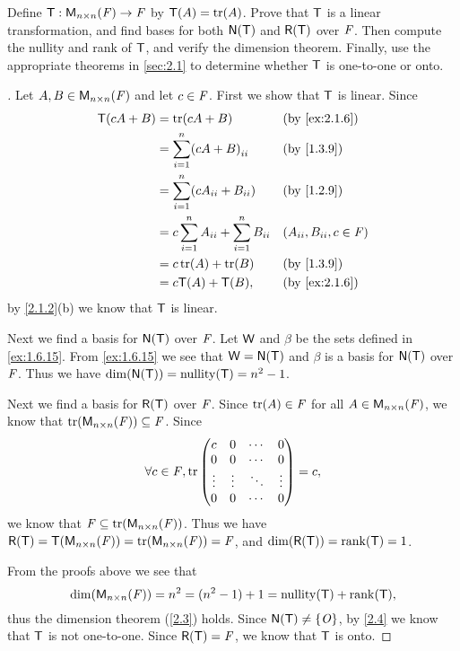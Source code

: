 \exercisesection

\setcounter{ex}{5}
\begin{ex}\label{ex:2.1.6}
  Define \(\mathsf{T} : \mathsf{M}_{{n} \times n}({\mathit{F}}) \to \mathit{F}\) by \(\T(A) = \tr[A]\).
  Prove that \(\mathsf{T}\) is a linear transformation, and find bases for both \(\ns{\T}\) and \(\rg{\T}\) over \(\mathit{F}\).
  Then compute the nullity and rank of \(\mathsf{T}\), and verify the dimension theorem.
  Finally, use the appropriate theorems in \cref{sec:2.1} to determine whether \(\mathsf{T}\) is one-to-one or onto.
\end{ex}

\begin{proof}[]
  Let \(A, B \in \mathsf{M}_{{n} \times n}({\mathit{F}})\) and let \(c \in \mathit{F}\).
  First we show that \(\mathsf{T}\) is linear.
  Since
  \begin{align*}
    \T(cA + B) & = \tr[cA + B]                                       &  & \text{(by \cref{ex:2.1.6})}  \\
               & = \sum_{i = 1}^n \pa{cA + B}_{i i}                  &  & \text{(by \cref{1.3.9})}     \\
               & = \sum_{i = 1}^n \pa{cA_{i i} + B_{i i}}            &  & \text{(by \cref{1.2.9})}     \\
               & = c \sum_{i = 1}^n A_{i i} + \sum_{i = 1}^n B_{i i} &  & (A_{i i}, B_{i i}, c \in \F) \\
               & = c \tr[A] + \tr[B]                                 &  & \text{(by \cref{1.3.9})}     \\
               & = c \T(A) + \T(B),                                  &  & \text{(by \cref{ex:2.1.6})}
  \end{align*}
  by \cref{2.1.2}(b) we know that \(\mathsf{T}\) is linear.

  Next we find a basis for \(\ns{\T}\) over \(\mathit{F}\).
  Let \(\mathsf{W}\) and \(\beta\) be the sets defined in \cref{ex:1.6.15}.
  From \cref{ex:1.6.15} we see that \(\W = \ns{\T}\) and \(\beta\) is a basis for \(\ns{\T}\) over \(\mathit{F}\).
  Thus we have \(\dim(\ns{\T}) = \nt{\T} = n^2 - 1\).

  Next we find a basis for \(\rg{\T}\) over \(\mathit{F}\).
  Since \(\tr[A] \in \F\) for all \(A \in \mathsf{M}_{{n} \times n}({\mathit{F}})\), we know that \(\tr[\ms{n}{n}{\F}] \subseteq \F\).
  Since
  \[
    \forall c \in \F, \tr\begin{pmatrix}
      c      & 0      & \cdots & 0      \\
      0      & 0      & \cdots & 0      \\
      \vdots & \vdots & \ddots & \vdots \\
      0      & 0      & \cdots & 0
    \end{pmatrix} = c,
  \]
  we know that \(\F \subseteq \tr[\ms{n}{n}{\F}]\).
  Thus we have \(\rg{\T} = \T(\ms{n}{n}{\F}) = \tr[\ms{n}{n}{\F}] = \F\), and \(\dim(\rg{\T}) = \rk{\T} = 1\).

  From the proofs above we see that
  \[
    \dim(\ms{n}{n}{\F}) = n^2 = (n^2 - 1) + 1 = \nt{\T} + \rk{\T},
  \]
  thus the dimension theorem (\cref{2.3}) holds.
  Since \(\ns{\T} \neq \set{\zm}\), by \cref{2.4} we know that \(\mathsf{T}\) is not one-to-one.
  Since \(\rg{\T} = \F\), we know that \(\mathsf{T}\) is onto.
\end{proof}

